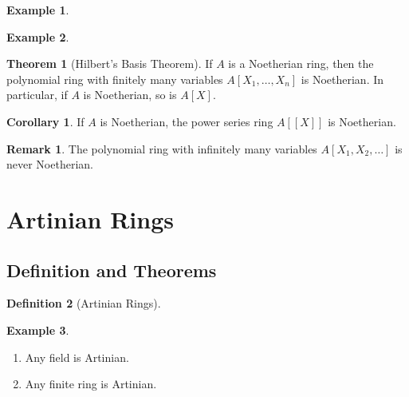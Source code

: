 \documentclass[a4paper]{book}
\theoremstyle{definition}
\newtheorem{definition}{Definition}[]
\newtheorem{example}{Example}[definition]
\newtheorem{theorem}[definition]{Theorem}
\newtheorem{corollary}{Corollary}
\newtheorem*{remark}{Remark}
\begin{document}
\begin{example}
    
\end{example}

\begin{example}
    
\end{example}

\begin{thmbox}
    \begin{theorem}[Hilbert's Basis Theorem]
        If \(A\) is a Noetherian ring, then the polynomial ring with finitely many variables \(A[X_1, \ldots, X_n]\) is Noetherian. In particular, if \(A\) is Noetherian, so is \(A[X]\).
    \end{theorem}
\end{thmbox}

\begin{thmbox}
    \begin{corollary}
        If \(A\) is Noetherian, the power series ring \(A[[X]]\) is Noetherian.
    \end{corollary}
\end{thmbox}

\begin{rembox}
    \begin{remark}
        The polynomial ring with infinitely many variables \(A[X_1, X_2, \ldots]\) is never Noetherian.
    \end{remark}
\end{rembox}

\newpage
\section{Artinian Rings}

\subsection*{Definition and Theorems}

\begin{defbox}
    \begin{definition}[Artinian Rings]
        
    \end{definition}
\end{defbox}

\begin{exmbox}
    \begin{example}
        \begin{enumerate}
            \item Any field is Artinian.
            \item Any finite ring is Artinian.
        \end{enumerate}
    \end{example}
\end{exmbox}
\end{document}

